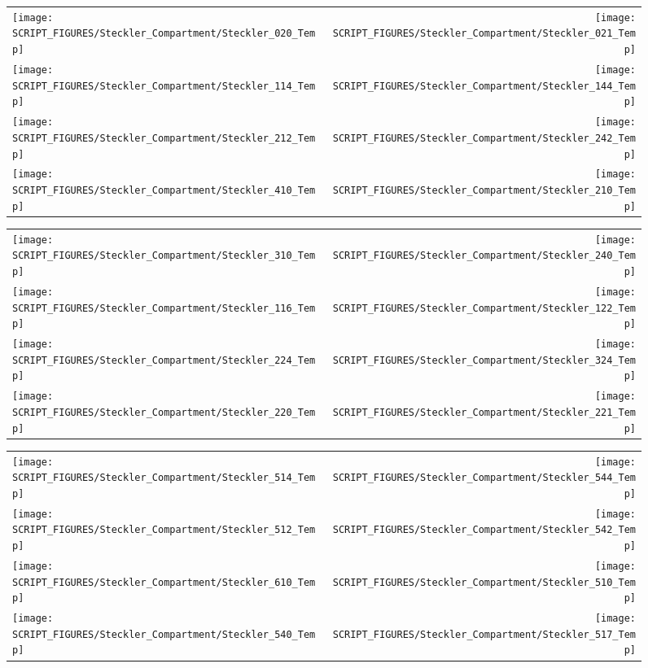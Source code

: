 \begin{figure}[p]
\begin{tabular*}{\textwidth}{l@{\extracolsep{\fill}}r}
\texttt{[image: SCRIPT\_FIGURES/Steckler\_Compartment/Steckler\_020\_Temp]} &
\texttt{[image: SCRIPT\_FIGURES/Steckler\_Compartment/Steckler\_021\_Temp]} \\
\texttt{[image: SCRIPT\_FIGURES/Steckler\_Compartment/Steckler\_114\_Temp]} &
\texttt{[image: SCRIPT\_FIGURES/Steckler\_Compartment/Steckler\_144\_Temp]} \\
\texttt{[image: SCRIPT\_FIGURES/Steckler\_Compartment/Steckler\_212\_Temp]} &
\texttt{[image: SCRIPT\_FIGURES/Steckler\_Compartment/Steckler\_242\_Temp]} \\
\texttt{[image: SCRIPT\_FIGURES/Steckler\_Compartment/Steckler\_410\_Temp]} &
\texttt{[image: SCRIPT\_FIGURES/Steckler\_Compartment/Steckler\_210\_Temp]}
\end{tabular*}
\end{figure}

\begin{figure}[p]
\begin{tabular*}{\textwidth}{l@{\extracolsep{\fill}}r}
\texttt{[image: SCRIPT\_FIGURES/Steckler\_Compartment/Steckler\_310\_Temp]} &
\texttt{[image: SCRIPT\_FIGURES/Steckler\_Compartment/Steckler\_240\_Temp]} \\
\texttt{[image: SCRIPT\_FIGURES/Steckler\_Compartment/Steckler\_116\_Temp]} &
\texttt{[image: SCRIPT\_FIGURES/Steckler\_Compartment/Steckler\_122\_Temp]} \\
\texttt{[image: SCRIPT\_FIGURES/Steckler\_Compartment/Steckler\_224\_Temp]} &
\texttt{[image: SCRIPT\_FIGURES/Steckler\_Compartment/Steckler\_324\_Temp]} \\
\texttt{[image: SCRIPT\_FIGURES/Steckler\_Compartment/Steckler\_220\_Temp]} &
\texttt{[image: SCRIPT\_FIGURES/Steckler\_Compartment/Steckler\_221\_Temp]}
\end{tabular*}
\end{figure}

\begin{figure}[p]
\begin{tabular*}{\textwidth}{l@{\extracolsep{\fill}}r}
\texttt{[image: SCRIPT\_FIGURES/Steckler\_Compartment/Steckler\_514\_Temp]} &
\texttt{[image: SCRIPT\_FIGURES/Steckler\_Compartment/Steckler\_544\_Temp]} \\
\texttt{[image: SCRIPT\_FIGURES/Steckler\_Compartment/Steckler\_512\_Temp]} &
\texttt{[image: SCRIPT\_FIGURES/Steckler\_Compartment/Steckler\_542\_Temp]} \\
\texttt{[image: SCRIPT\_FIGURES/Steckler\_Compartment/Steckler\_610\_Temp]} &
\texttt{[image: SCRIPT\_FIGURES/Steckler\_Compartment/Steckler\_510\_Temp]} \\
\texttt{[image: SCRIPT\_FIGURES/Steckler\_Compartment/Steckler\_540\_Temp]} &
\texttt{[image: SCRIPT\_FIGURES/Steckler\_Compartment/Steckler\_517\_Temp]}
\end{tabular*}
\end{figure}

